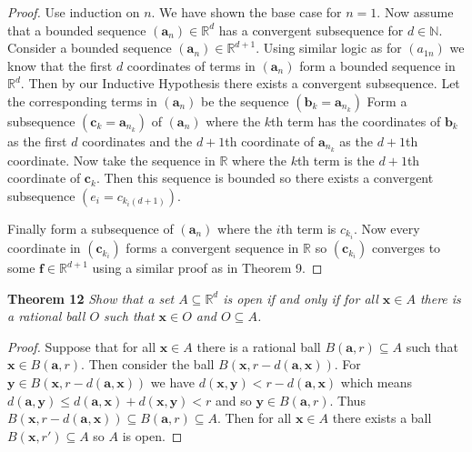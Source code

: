 \documentclass{article}
\begin{document}
\begin{flushleft}
\begin{proof}
Use induction on $n$. We have shown the base case for $n=1$. Now assume that a bounded sequence $(\mathbf{a}_n) \in \mathbb{R}^d$ has a convergent subsequence for $d \in \mathbb{N}$. Consider a bounded sequence $(\mathbf{a}_n) \in \mathbb{R}^{d+1}$. Using similar logic as for $(a_{1n})$ we know that the first $d$ coordinates of terms in $(\mathbf{a}_n)$ form a bounded sequence in $\mathbb{R}^d$. Then by our Inductive Hypothesis there exists a convergent subsequence. Let the corresponding terms in $(\mathbf{a}_n)$ be the sequence $(\mathbf{b}_k = \mathbf{a}_{n_k})$  Form a subsequence $(\mathbf{c}_k = \mathbf{a}_{n_k})$ of $(\mathbf{a}_n)$ where the $k$th term has the coordinates of $\mathbf{b}_k$ as the first $d$ coordinates and the $d+1$th coordinate of $\mathbf{a}_{n_k}$ as the $d+1$th coordinate. Now take the sequence in $\mathbb{R}$ where the $k$th term is the $d+1$th coordinate of $\mathbf{c}_k$. Then this sequence is bounded so there exists a convergent subsequence $(e_i = c_{k_i (d+1)})$.\newline

Finally form a subsequence of $(\mathbf{a}_n)$ where the $i$th term is $c_{k_i}$. Now every coordinate in $(\mathbf{c}_{k_i})$ forms a convergent sequence in $\mathbb{R}$ so $(\mathbf{c}_{k_i})$ converges to some $\mathbf{f} \in \mathbb{R}^{d+1}$ using a similar proof as in Theorem 9.
\end{proof}

\textbf{Theorem 12}
\textsl{Show that a set $A \subseteq \mathbb{R}^d$ is open if and only if for all $\mathbf{x} \in A$ there is a rational ball $O$ such that $\mathbf{x} \in O$ and $O \subseteq A$.}
\begin{proof}
Suppose that for all $\mathbf{x} \in A$ there is a rational ball $B(\mathbf{a}, r) \subseteq A$ such that $\mathbf{x} \in B(\mathbf{a}, r)$. Then consider the ball $B(\mathbf{x}, r-d(\mathbf{a}, \mathbf{x}))$. For $\mathbf{y} \in B(\mathbf{x}, r-d(\mathbf{a}, \mathbf{x}))$ we have $d(\mathbf{x}, \mathbf{y}) < r-d(\mathbf{a}, \mathbf{x})$ which means $d(\mathbf{a}, \mathbf{y}) \leq d(\mathbf{a}, \mathbf{x}) + d(\mathbf{x}, \mathbf{y}) < r$ and so $\mathbf{y} \in B(\mathbf{a}, r)$. Thus $B(\mathbf{x}, r-d(\mathbf{a}, \mathbf{x})) \subseteq B(\mathbf{a}, r) \subseteq A$. Then for all $\mathbf{x} \in A$ there exists a ball $B(\mathbf{x}, r') \subseteq A$ so $A$ is open.\newline


\end{proof}
\end{flushleft}
\end{document}
